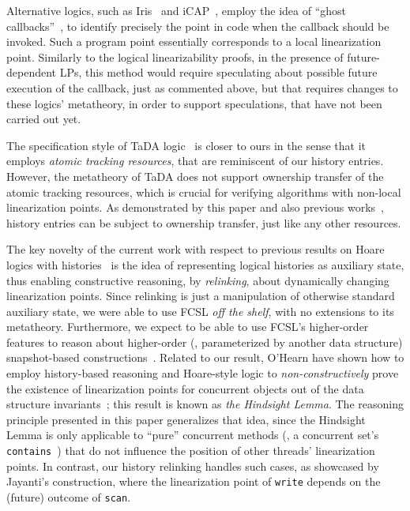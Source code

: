 Alternative logics, such as
Iris~\cite{JungSSSTBD+POPL15,JungKBD+ICFP16} and
iCAP~\cite{SvendsenB+ESOP14}, employ the idea of ``ghost
callbacks''~\cite{Jacobs-Piessens+POPL11}, to identify precisely the
point in code when the callback should be invoked.  Such a program
point essentially corresponds to a local linearization
point. Similarly to the logical linearizability proofs, in the
presence of future-dependent LPs, this method would require
speculating about possible future execution of the callback, just as
commented above, but that requires changes to these logics'
metatheory, in order to support speculations, that have not been
carried out yet.

The specification style of TaDA logic~\cite{PintoDYG+ECOOP14} is
closer to ours in the sense that it employs \emph{atomic tracking
  resources}, that are reminiscent of our history entries. However,
the metatheory of TaDA does not support ownership transfer of the
atomic tracking resources, which is crucial for verifying algorithms
with non-local linearization points. As demonstrated by this paper and
also previous works~\cite{SergeyNB+ESOP15,SergeyNBD+OOPSLA16}, history
entries can be subject to ownership transfer, just like any other
resources.


The key novelty of the current work with respect to previous results
on Hoare logics with histories~\cite{FuLFSZ+CONCUR10, LiangF+PLDI13,
  GotsmanRY+ESOP13, BellAW+SAS10, SergeyNB+ESOP15, HemedRV+DISC15} is
the idea of representing logical histories as auxiliary state, thus
enabling constructive reasoning, by \emph{relinking}, about
dynamically changing linearization points.
%
Since relinking is just a manipulation of otherwise standard auxiliary
state, we were able to use FCSL \emph{off the shelf}, with no
extensions to its metatheory. Furthermore, we expect to be able to use
FCSL's higher-order features to reason about higher-order (\ie,
parameterized by another data structure) snapshot-based
constructions~\cite{PetrankT+DISC13}.
%
Related to our result, O'Hearn \etal have shown how to employ
history-based reasoning and Hoare-style logic to
\emph{non-constructively} prove the existence of linearization points
for concurrent objects out of the data structure
invariants~\cite{OHearnRVYY+PODC10}; this result is known as \emph{the
  Hindsight Lemma}. The reasoning principle presented in this paper
generalizes that idea, since the Hindsight Lemma is only applicable to
``pure'' concurrent methods (\eg, a concurrent set's
\texttt{contains}~\cite{HellerHLMSS+OPODIS05}) that do not influence
the position of other threads' linearization points. In contrast, our
history relinking handles such cases, as showcased by Jayanti's
construction, where the linearization point of \texttt{write} depends
on the (future) outcome of \texttt{scan}.

